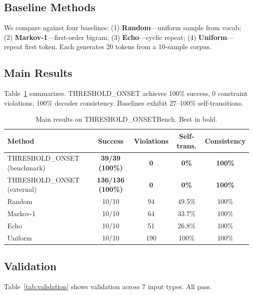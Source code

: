 \documentclass[10pt]{article}
\begin{document}
\subsection{Baseline Methods}

We compare against four baselines: (1) \textbf{Random}---uniform sample from vocab; (2) \textbf{Markov-1}---first-order bigram; (3) \textbf{Echo}---cyclic repeat; (4) \textbf{Uniform}---repeat first token. Each generates 20 tokens from a 10-sample corpus.

\subsection{Main Results}

Table~\ref{tab:main} summarizes. THRESHOLD\_ONSET achieves 100\% success, 0 constraint violations, 100\% decoder consistency. Baselines exhibit 27--100\% self-transitions.

\begin{table}[t]
\centering
\caption{Main results on THRESHOLD\_ONSETBench. Best in bold.}
\label{tab:main}
\begin{tabular}{lcccc}
\toprule
\textbf{Method} & \textbf{Success} & \textbf{Violations} & \textbf{Self-trans.} & \textbf{Consistency} \\
\midrule
THRESHOLD\_ONSET (benchmark) & \textbf{39/39 (100\%)} & \textbf{0} & \textbf{0\%} & \textbf{100\%} \\
THRESHOLD\_ONSET (external) & \textbf{136/136 (100\%)} & \textbf{0} & \textbf{0\%} & \textbf{100\%} \\
Random & 10/10 & 94 & 49.5\% & 100\% \\
Markov-1 & 10/10 & 64 & 33.7\% & 100\% \\
Echo & 10/10 & 51 & 26.8\% & 100\% \\
Uniform & 10/10 & 190 & 100\% & 100\% \\
\bottomrule
\end{tabular}
\end{table}

\subsection{Validation}

Table~\ref{tab:validation} shows validation across 7 input types. All pass.
\end{document}
